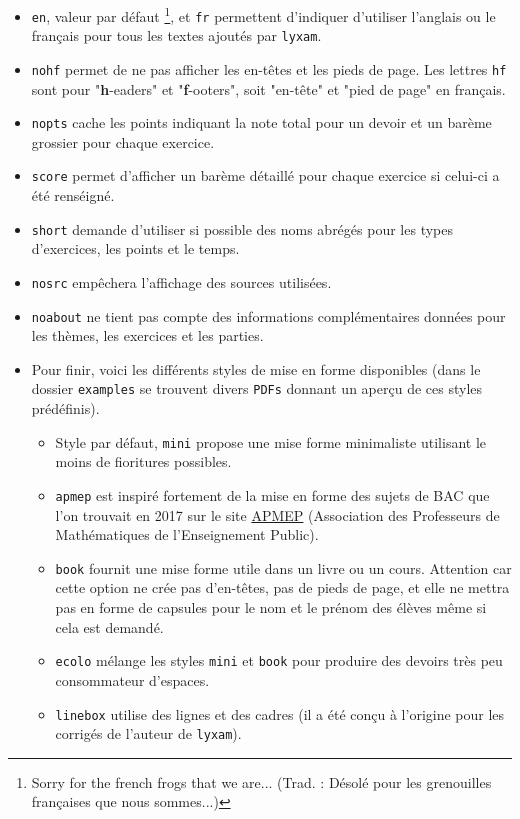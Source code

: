 \documentclass[12pt,a4paper]{scrartcl}
\theoremstyle{definition}
\begin{document}
\begin{itemize}
	\item \verb+en+, valeur par défaut
	\footnote{
		Sorry for the french frogs that we are... (Trad. : Désolé pour les grenouilles françaises que nous sommes...)
	}, et \verb+fr+ permettent d'indiquer d'utiliser l'anglais ou le français pour tous les textes ajoutés par \verb+lyxam+.

	\item \verb+nohf+ permet de ne pas afficher les en-têtes et les pieds de page.
	Les lettres \verb+hf+ sont pour "\textbf{h}-eaders" et "\textbf{f}-ooters", soit "en-tête" et "pied de page" en français.

	\item \verb+nopts+ cache les points indiquant la note total pour un devoir et un barème grossier pour chaque exercice.

	\item \verb+score+ permet d'afficher un barème détaillé pour chaque exercice si celui-ci a été renséigné.

	\item \verb+short+ demande d'utiliser si possible des noms abrégés pour les types d'exercices, les points et le temps.

	\item \verb+nosrc+ empêchera l'affichage des sources utilisées.

	\item \verb+noabout+ ne tient pas compte des informations complémentaires données pour les thèmes, les exercices et les parties.

	\item Pour finir, voici les différents styles de mise en forme disponibles (dans le dossier \verb+examples+ se trouvent divers \verb+PDFs+ donnant un aperçu de ces styles prédéfinis).
	\begin{itemize}[label={\small\textbullet}]
        \item Style par défaut, \verb+mini+ propose une mise forme minimaliste utilisant le moins de fioritures possibles.
        
        \item \verb+apmep+ est inspiré fortement de la mise en forme des sujets de BAC que l'on trouvait en 2017 sur le site \href{https://www.apmep.fr}{APMEP} (Association des Professeurs de Mathématiques de l'Enseignement Public).
        
        \item \verb+book+ fournit une mise forme utile dans un livre ou un cours. Attention car cette option ne crée pas d'en-têtes, pas de pieds de page, et elle ne mettra pas en forme de capsules pour le nom et le prénom des élèves même si cela est demandé.
        
        \item \verb+ecolo+ mélange les styles \verb+mini+ et \verb+book+ pour produire des devoirs très peu consommateur d'espaces.
        
        \item \verb+linebox+ utilise des lignes et des cadres (il a été conçu à l'origine pour les corrigés de l'auteur de \verb+lyxam+).
    \end{itemize}
\end{itemize}
\end{document}
